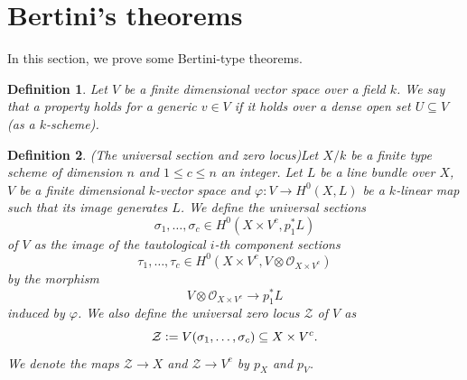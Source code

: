 \documentclass[a4paper,12pt]{amsart}
\newtheorem{definition}{Definition}[section]
\numberwithin{equation}{section}
\newcommand{\defeq}{\vcentcolon=}
\renewcommand{\leq}{\leqslant}
\renewcommand{\_}{\rule{0.25cm}{0.4pt}}
\begin{document}
\section{Bertini's theorems}\label{2}
In this section, we prove some Bertini-type theorems.
\begin{definition}
    Let $V$ be a finite dimensional vector space over a field $k$. We say that a property holds for a generic $v\in V$ if it holds over a dense open set $U\subseteq V$ (as a $k$-scheme).
\end{definition}

\begin{definition}{(The universal section and zero locus)}\label{universal locus def}
Let $X/k$ be a finite type scheme of dimension $n$ and $1\leq c\leq n$ an integer. Let $L$ be a line bundle over $X$, $V$ be a finite dimensional $k$-vector space and $\varphi\colon V\to H^{0}(X,L)$ be a $k$-linear map such that its image generates $L$. We define the universal sections
    \[
    \sigma_{1},\dots, \sigma_{c}\in H^{0}(X\times V^{c}, p_{1}^{\ast}L)
    \]
    of $V$ as the image of the tautological $i$-th component sections 
    \[
    \tau_{1},\dots,\tau_{c}\in H^{0}(X\times V^{c}, V\otimes \mathcal{O}_{X\times V^{c}})
    \]
    by the morphism
    \[
    V\otimes \mathcal{O}_{X\times V^{c}}\to p_{1}^{\ast}L
    \]
    induced by $\varphi$. We also define the universal zero locus $\mathcal{Z}$ of $V$ as
    \[
    \mathcal{Z}\defeq V(\sigma_{1},\dots, \sigma_{c})\subseteq X\times V^{c}.
    \]
    We denote the maps $\mathcal{Z}\to X$ and $\mathcal{Z}\to V^{c}$ by $p_{X}$ and $p_{V}$.
\end{definition}
\end{document}
